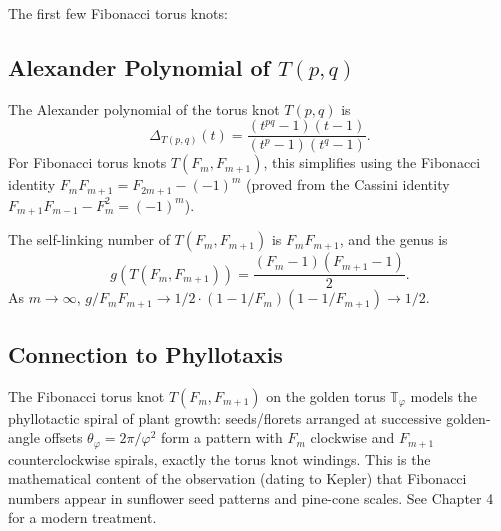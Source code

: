 The first few Fibonacci torus knots:
\begin{center}
\end{center}

\subsection{Alexander Polynomial of \texorpdfstring{$T(p,q)$}{T(p,q)}}
\label{subsec:ch18-alexander}

The Alexander polynomial of the torus knot $T(p,q)$ is
\begin{equation}\label{eq:alexander}
  \Delta_{T(p,q)}(t) = \frac{(t^{pq}-1)(t-1)}{(t^p-1)(t^q-1)}.
\end{equation}
For Fibonacci torus knots $T(F_m, F_{m+1})$, this simplifies using the
Fibonacci identity $F_m F_{m+1} = F_{2m+1} - (-1)^m$
(proved from the Cassini identity $F_{m+1}F_{m-1} - F_m^2 = (-1)^m$).

\begin{proposition}\label{prop:fib-knot-selflink}
The self-linking number of $T(F_m, F_{m+1})$ is $F_m F_{m+1}$,
and the genus is
\begin{equation}
  g(T(F_m,F_{m+1})) = \frac{(F_m-1)(F_{m+1}-1)}{2}.
\end{equation}
As $m \to \infty$, $g/F_m F_{m+1} \to 1/2 \cdot (1 - 1/F_m)(1 - 1/F_{m+1}) \to 1/2$.
\end{proposition}

\subsection{Connection to Phyllotaxis}\label{subsec:ch18-phyllotaxis}

The Fibonacci torus knot $T(F_m, F_{m+1})$ on the golden torus $\mathbb{T}_\varphi$
models the phyllotactic spiral of plant growth: seeds/florets arranged at successive
golden-angle offsets $\theta_\varphi = 2\pi/\varphi^2$ form a pattern with
$F_m$ clockwise and $F_{m+1}$ counterclockwise spirals, exactly the torus knot
windings.
This is the mathematical content of the observation (dating to Kepler) that
Fibonacci numbers appear in sunflower seed patterns and pine-cone scales.
See \cite{Stillwell1992} Chapter 4 for a modern treatment.

